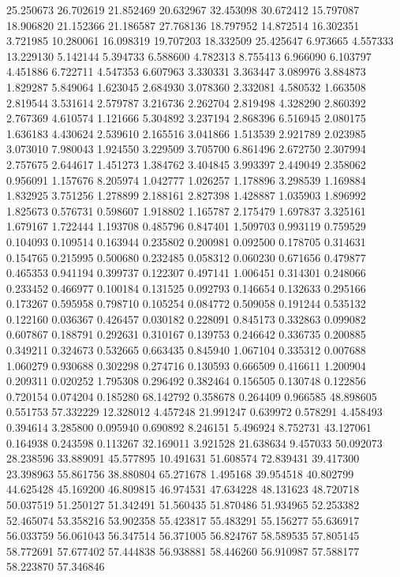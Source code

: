 25.250673
26.702619
21.852469
20.632967
32.453098
30.672412
15.797087
18.906820
21.152366
21.186587
27.768136
18.797952
14.872514
16.302351
3.721985
10.280061
16.098319
19.707203
18.332509
25.425647
6.973665
4.557333
13.229130
5.142144
5.394733
6.588600
4.782313
8.755413
6.966090
6.103797
4.451886
6.722711
4.547353
6.607963
3.330331
3.363447
3.089976
3.884873
1.829287
5.849064
1.623045
2.684930
3.078360
2.332081
4.580532
1.663508
2.819544
3.531614
2.579787
3.216736
2.262704
2.819498
4.328290
2.860392
2.767369
4.610574
1.121666
5.304892
3.237194
2.868396
6.516945
2.080175
1.636183
4.430624
2.539610
2.165516
3.041866
1.513539
2.921789
2.023985
3.073010
7.980043
1.924550
3.229509
3.705700
6.861496
2.672750
2.307994
2.757675
2.644617
1.451273
1.384762
3.404845
3.993397
2.449049
2.358062
0.956091
1.157676
8.205974
1.042777
1.026257
1.178896
3.298539
1.169884
1.832925
3.751256
1.278899
2.188161
2.827398
1.428887
1.035903
1.896992
1.825673
0.576731
0.598607
1.918802
1.165787
2.175479
1.697837
3.325161
1.679167
1.722444
1.193708
0.485796
0.847401
1.509703
0.993119
0.759529
0.104093
0.109514
0.163944
0.235802
0.200981
0.092500
0.178705
0.314631
0.154765
0.215995
0.500680
0.232485
0.058312
0.060230
0.671656
0.479877
0.465353
0.941194
0.399737
0.122307
0.497141
1.006451
0.314301
0.248066
0.233452
0.466977
0.100184
0.131525
0.092793
0.146654
0.132633
0.295166
0.173267
0.595958
0.798710
0.105254
0.084772
0.509058
0.191244
0.535132
0.122160
0.036367
0.426457
0.030182
0.228091
0.845173
0.332863
0.099082
0.607867
0.188791
0.292631
0.310167
0.139753
0.246642
0.336735
0.200885
0.349211
0.324673
0.532665
0.663435
0.845940
1.067104
0.335312
0.007688
1.060279
0.930688
0.302298
0.274716
0.130593
0.666509
0.416611
1.200904
0.209311
0.020252
1.795308
0.296492
0.382464
0.156505
0.130748
0.122856
0.720154
0.074204
0.185280
68.142792
0.358678
0.264409
0.966585
48.898605
0.551753
57.332229
12.328012
4.457248
21.991247
0.639972
0.578291
4.458493
0.394614
3.285800
0.095940
0.690892
8.246151
5.496924
8.752731
43.127061
0.164938
0.243598
0.113267
32.169011
3.921528
21.638634
9.457033
50.092073
28.238596
33.889091
45.577895
10.491631
51.608574
72.839431
39.417300
23.398963
55.861756
38.880804
65.271678
1.495168
39.954518
40.802799
44.625428
45.169200
46.809815
46.974531
47.634228
48.131623
48.720718
50.037519
51.250127
51.342491
51.560435
51.870486
51.934965
52.253382
52.465074
53.358216
53.902358
55.423817
55.483291
55.156277
55.636917
56.033759
56.061043
56.347514
56.371005
56.824767
58.589535
57.805145
58.772691
57.677402
57.444838
56.938881
58.446260
56.910987
57.588177
58.223870
57.346846
